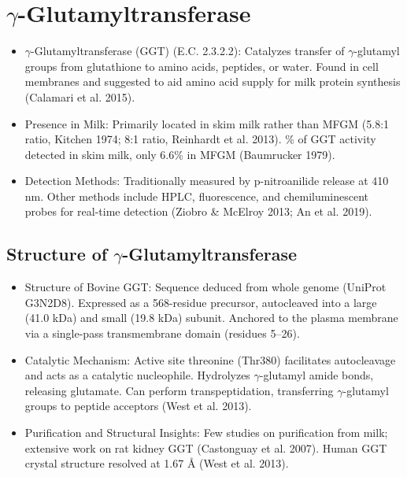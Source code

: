 \section{$\gamma$-Glutamyltransferase}
\begin{itemize}
    \item $\gamma$-Glutamyltransferase (GGT) (E.C. 2.3.2.2):
    \subitem Catalyzes transfer of $\gamma$-glutamyl groups from glutathione to amino acids, peptides, or water.
    \subitem Found in cell membranes and suggested to aid amino acid supply for milk protein synthesis (Calamari et al. 2015).

    \item Presence in Milk:
    \subitem Primarily located in skim milk rather than MFGM (5.8:1 ratio, Kitchen 1974; 8:1 ratio, Reinhardt et al. 2013).
    \% of GGT activity detected in skim milk, only 6.6\% in MFGM (Baumrucker 1979).

    \item Detection Methods:
    \subitem Traditionally measured by p-nitroanilide release at 410 nm.
    \subitem Other methods include HPLC, fluorescence, and chemiluminescent probes for real-time detection (Ziobro \& McElroy 2013; An et al. 2019).
\end{itemize}


\subsection*{Structure of $\gamma$-Glutamyltransferase}
\begin{itemize}
    \item Structure of Bovine GGT:
    \subitem Sequence deduced from whole genome (UniProt G3N2D8).
    \subitem Expressed as a 568-residue precursor, autocleaved into a large (41.0 kDa) and small (19.8 kDa) subunit.
    \subitem Anchored to the plasma membrane via a single-pass transmembrane domain (residues 5–26).

    \item Catalytic Mechanism:
    \subitem Active site threonine (Thr380) facilitates autocleavage and acts as a catalytic nucleophile.
    \subitem Hydrolyzes $\gamma$-glutamyl amide bonds, releasing glutamate.
    \subitem Can perform transpeptidation, transferring $\gamma$-glutamyl groups to peptide acceptors (West et al. 2013).

    \item Purification and Structural Insights:
    \subitem Few studies on purification from milk; extensive work on rat kidney GGT (Castonguay et al. 2007).
    \subitem Human GGT crystal structure resolved at 1.67 Å (West et al. 2013).
\end{itemize}

